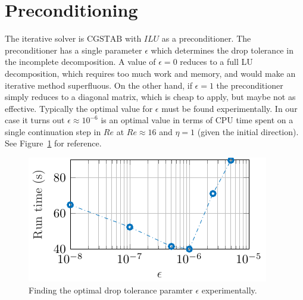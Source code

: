 \section{Preconditioning}

The iterative solver is $\textrm{CGSTAB}$ with $ILU$ as a preconditioner. The preconditioner has a single parameter $\epsilon$ which determines the drop tolerance in the incomplete decomposition. A value of $\epsilon = 0$ reduces to a full LU decomposition, which requires too much work and memory, and would make an iterative method superfluous. On the other hand, if $\epsilon = 1$ the preconditioner simply reduces to a diagonal matrix, which is cheap to apply, but maybe not as effective. Typically the optimal value for $\epsilon$ must be found experimentally. In our case it turns out $\epsilon \approx 10^{-6}$ is an optimal value in terms of CPU time spent on a single continuation step in $Re$ at $Re \approx 16$ and $\eta = 1$ (given the initial direction). See Figure~\ref{fig:optimal_epsilon} for reference.

\begin{figure}[h]
    \centerline{\includegraphics[width=\textwidth]{images/droptol_epsilon.pdf}}
    \caption{Finding the optimal drop tolerance paramter $\epsilon$ experimentally.}
    \label{fig:optimal_epsilon}
\end{figure}